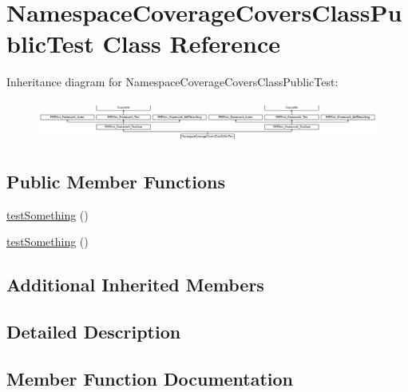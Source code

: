 \hypertarget{class_namespace_coverage_covers_class_public_test}{}\section{Namespace\+Coverage\+Covers\+Class\+Public\+Test Class Reference}
\label{class_namespace_coverage_covers_class_public_test}
Inheritance diagram for Namespace\+Coverage\+Covers\+Class\+Public\+Test\+:\begin{figure}[H]
\begin{center}
\leavevmode
\includegraphics[height=1.372549cm]{class_namespace_coverage_covers_class_public_test}
\end{center}
\end{figure}
\subsection*{Public Member Functions}
\begin{DoxyCompactItemize}
\item 
\mbox{\hyperlink{class_namespace_coverage_covers_class_public_test_a0fc4e17369bc9607ebdd850d9eda8167}{test\+Something}} ()
\item 
\mbox{\hyperlink{class_namespace_coverage_covers_class_public_test_a0fc4e17369bc9607ebdd850d9eda8167}{test\+Something}} ()
\end{DoxyCompactItemize}
\subsection*{Additional Inherited Members}


\subsection{Detailed Description}


\subsection{Member Function Documentation}
\mbox{\label{class_namespace_coverage_covers_class_public_test_a0fc4e17369bc9607ebdd850d9eda8167}} 
